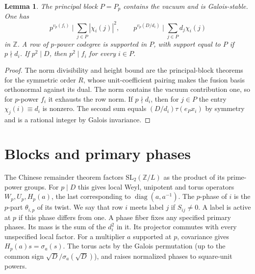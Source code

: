 \documentclass[11pt]{amsart}
\numberwithin{equation}{section}
\newtheorem{lemma}[theorem]{Lemma}
\theoremstyle{definition}
\theoremstyle{plain}
\newcommand{\ZZ}{\mathbb Z}
\begin{document}
\begin{lemma}\label{block:height}
The principal block $P=P_p$ contains the vacuum and is Galois-stable.
One has
\begin{equation}\label{eq:principal-trace}
 p^{v_p(f_i)}\mid\sum_{j\in P}|\chi_i(j)|^2,\qquad
 p^{v_p(D/d_i)}\mid\sum_{j\in P}d_j\chi_i(j)
\end{equation}
in $\ZZ$. A row of $p$-power codegree is supported in $P$, with
support equal to $P$ if $p\nmid d_i$. If $p^2\mid D$, then
$p^2\mid f_i$ for every $i\in P$.
\end{lemma}
\begin{proof}
The norm divisibility and height bound are the principal-block
theorems \cite[Theorem~2.11 and Corollary~4.1]{BDPcore} for the
symmetric order $R$, whose unit-coefficient pairing makes the fusion
basis orthonormal against its dual. The norm contains the vacuum
contribution one, so for $p$-power $f_i$ it exhausts the row norm.
If $p\nmid d_i$, then for $j\in P$ the entry $\chi_j(i)\equiv d_i$
is nonzero. The second sum equals $(D/d_i)\tau(e_Px_i)$ by symmetry
and is a rational integer by Galois invariance.
\end{proof}

\section{Blocks and primary phases}
The Chinese remainder theorem factors $\mathrm{SL}_2(\ZZ/L)$ as the product of its prime-power groups. For $p\mid D$ this gives local Weyl, unipotent
and torus operators $W_p,U_p,H_p(a)$, the last corresponding to
$\operatorname{diag}(a,a^{-1})$. The $p$-phase of $i$ is the
$p$-part $\theta_{i,p}$ of its twist. We say that row $i$ meets label $j$ if $S_{ij}\ne0$. A label is active at $p$ if
this phase differs from one. A phase fiber fixes any specified
primary phases. Its mass is the sum of the $d_i^2$ in it. Its
projector commutes with every unspecified local factor.
For a multiplier $a$ supported at $p$, covariance gives
$H_p(a)s=\sigma_a(s)$. The torus acts by the Galois permutation
(up to the common sign $\sqrt D/\sigma_a(\sqrt D)$), and raises
normalized phases to square-unit powers.
\end{document}
